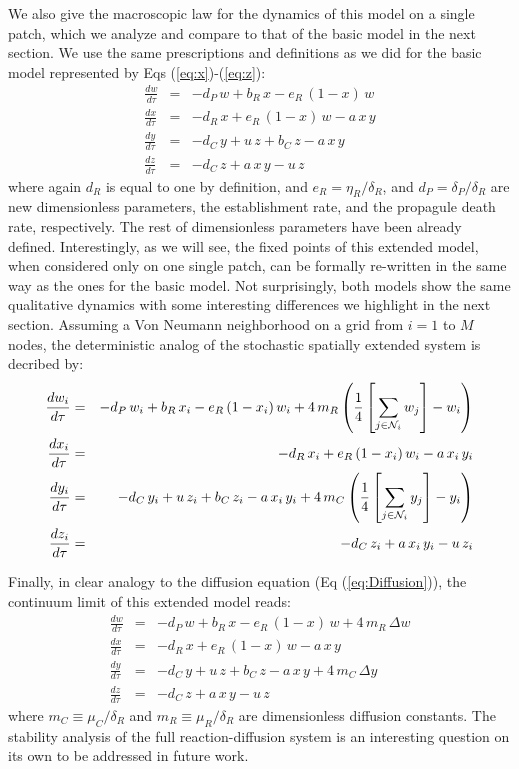 We also give the macroscopic law for the dynamics of this model on a single patch, which we analyze and compare to that of the basic model in the next section. We use the same prescriptions and definitions as we did for the basic model represented by Eqs (\ref{eq:x})-(\ref{eq:z}):
\begin{eqnarray}
\label{eq:ww}
\frac{dw}{d\tau}   & = & -d_P \,w + b_R\,x - e_R\,(1-x)\,w \\
\label{eq:xx}
\frac{dx}{d\tau}   & = & -d_R \,x + e_R\,(1-x)\,w -a\,x\,y \\
\label{eq:yy}
\frac{dy}{d\tau}   & = & -d_C \,y + u\,z + b_C\,z -a\,x\,y \\
\label{eq:zz}
\frac{dz}{d\tau}   & = & -d_C \,z + a\,x\,y -u\,z 
\end{eqnarray}
where again $d_R$ is equal to one by definition, and $e_R=\eta_R/\delta_R$, and $d_P = \delta_P/\delta_R$ are new dimensionless parameters, the establishment rate, and the propagule death rate, respectively. The rest of dimensionless parameters have been already defined. Interestingly, as we will see, the fixed points of this extended model, when considered only on one single patch, can be formally re-written in the same way as the ones for the basic model. Not surprisingly, both models show the same qualitative dynamics with some interesting differences we highlight in the next section. Assuming a Von Neumann neighborhood on a grid from $i=1$ to $M$ nodes, the deterministic analog of the stochastic spatially extended system is decribed by: 
\begin{eqnarray}
\label{eq:wwsd}
\frac{dw_i}{d\tau}   & = & -d_P \,w_i + b_R\,x_i - e_R\,(1-x_i)\,w_i + 4\,m_R \left(\frac{1}{4} \left[\sum_{j \in {\cal N}_i} w_j\right] - w_i\right)\\
\label{eq:xxsd}
\frac{dx_i}{d\tau}   & = & -d_R \,x_i + e_R\,(1-x_i)\,w_i -a\,x_i\,y_i \\
\label{eq:yysd}
\frac{dy_i}{d\tau}   & = & -d_C \,y_i + u\,z_i + b_C\,z_i -a\,x_i\,y_i + 4\,m_C \left(\frac{1}{4} \left[\sum_{j \in {\cal N}_i} y_j\right] - y_i\right)\\
\label{eq:zzsd}
\frac{dz_i}{d\tau}   & = & -d_C \,z_i + a\,x_i\,y_i -u\,z_i 
\end{eqnarray}

Finally, in clear analogy to the diffusion equation (Eq (\ref{eq:Diffusion})), the continuum limit of this extended model reads: 
\begin{eqnarray}
\label{eq:wws}
\frac{dw}{d\tau}   & = & -d_P \,w + b_R\,x - e_R\,(1-x)\,w + 4\,m_R \, \Delta w\\
\label{eq:xxs}
\frac{dx}{d\tau}   & = & -d_R \,x + e_R\,(1-x)\,w -a\,x\,y \\
\label{eq:yys}
\frac{dy}{d\tau}   & = & -d_C \,y + u\,z + b_C\,z -a\,x\,y + 4\, m_C \, \Delta y\\
\label{eq:zzs}
\frac{dz}{d\tau}   & = & -d_C \,z + a\,x\,y -u\,z 
\end{eqnarray}
where $m_C \equiv \mu_C/\delta_R$ and $m_R \equiv \mu_R/\delta_R$ are dimensionless diffusion constants. The stability analysis of the full reaction-diffusion system is an interesting question on its own to be addressed in future work.  
